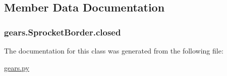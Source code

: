 \subsection{Member Data Documentation}
\hypertarget{classgears_1_1_sprocket_border_a2293099c37d12d6e54c968a1cce04c9d}{}
\subsubsection[{closed}]{\setlength{\rightskip}{0pt plus 5cm}gears.\+Sprocket\+Border.\+closed}\label{classgears_1_1_sprocket_border_a2293099c37d12d6e54c968a1cce04c9d}


The documentation for this class was generated from the following file\+:\begin{DoxyCompactItemize}
\item 
\hyperlink{gears_8py}{gears.\+py}\end{DoxyCompactItemize}
